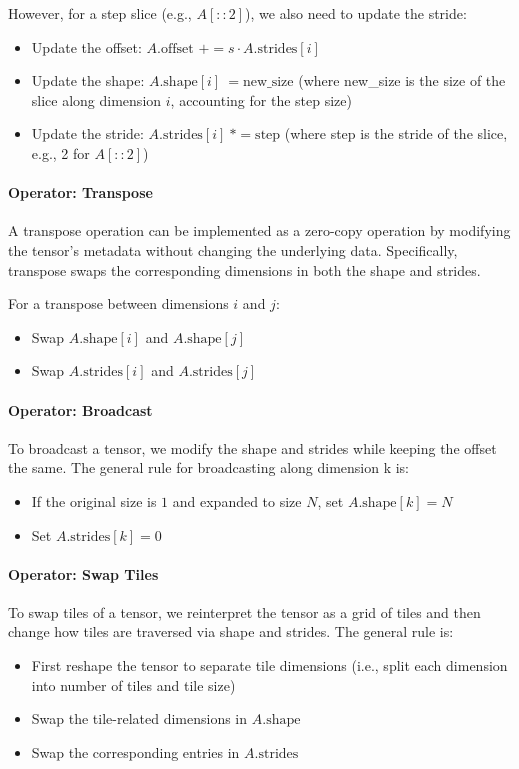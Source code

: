 \documentclass[twoside]{article}
\begin{document}
However, for a step slice (e.g., $A[::2]$), we also need to update the stride:
\begin{itemize}
    \item Update the offset: $A.\text{offset } += s \cdot A.\text{strides}[i]$ 
    \item Update the shape: $A.\text{shape}[i]\ = \text{new\_size}$ (where new\_size is the size of the slice along dimension $i$, accounting for the step size)
    \item Update the stride: $A.\text{strides}[i]\ *= \text{step}$ (where step is the stride of the slice, e.g., 2 for $A[::2]$)
\end{itemize}

\paragraph{Operator: Transpose}
A transpose operation can be implemented as a zero-copy operation by modifying the tensor's metadata without changing the underlying data. Specifically, transpose swaps the corresponding dimensions in both the shape and strides.

For a transpose between dimensions $i$ and $j$:
\begin{itemize}
    \item Swap $A.\text{shape}[i]$ and $A.\text{shape}[j]$
    \item Swap $A.\text{strides}[i]$ and $A.\text{strides}[j]$
\end{itemize}

\paragraph{Operator: Broadcast}
To broadcast a tensor, we modify the shape and strides while keeping the offset the same. The general rule for broadcasting along dimension k is:
\begin{itemize}
\item If the original size is $1$ and expanded to size $N$, set $A.\text{shape}[k] = N$
\item Set $A.\text{strides}[k] = 0$
\end{itemize}

\paragraph{Operator: Swap Tiles}
To swap tiles of a tensor, we reinterpret the tensor as a grid of tiles and then change how tiles are traversed via shape and strides. The general rule is:
\begin{itemize}
    \item First reshape the tensor to separate tile dimensions (i.e., split each dimension into number of tiles and tile size)
    \item Swap the tile-related dimensions in $A.\text{shape}$
    \item Swap the corresponding entries in $A.\text{strides}$
\end{itemize}
\end{document}
